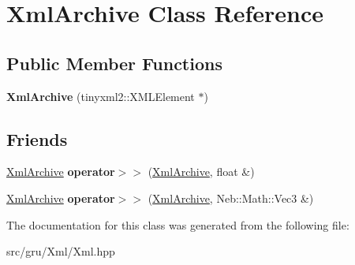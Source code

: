 \hypertarget{classXmlArchive}{\section{\-Xml\-Archive \-Class \-Reference}
\label{classXmlArchive}
}
\subsection*{\-Public \-Member \-Functions}
\begin{DoxyCompactItemize}
\item 
\hypertarget{classXmlArchive_af60507762c0e126c686ba370b502c519}{{\bfseries \-Xml\-Archive} (tinyxml2\-::\-X\-M\-L\-Element $\ast$)}\label{classXmlArchive_af60507762c0e126c686ba370b502c519}

\end{DoxyCompactItemize}
\subsection*{\-Friends}
\begin{DoxyCompactItemize}
\item 
\hypertarget{classXmlArchive_ac00483f1bd65b3d880d13399bdf383a1}{\hyperlink{classXmlArchive}{\-Xml\-Archive} {\bfseries operator$>$$>$} (\hyperlink{classXmlArchive}{\-Xml\-Archive}, float \&)}\label{classXmlArchive_ac00483f1bd65b3d880d13399bdf383a1}

\item 
\hypertarget{classXmlArchive_ada2eb5f73207ee6133a5f6876c0bbe79}{\hyperlink{classXmlArchive}{\-Xml\-Archive} {\bfseries operator$>$$>$} (\hyperlink{classXmlArchive}{\-Xml\-Archive}, \-Neb\-::\-Math\-::\-Vec3 \&)}\label{classXmlArchive_ada2eb5f73207ee6133a5f6876c0bbe79}

\end{DoxyCompactItemize}


\-The documentation for this class was generated from the following file\-:\begin{DoxyCompactItemize}
\item 
src/gru/\-Xml/\-Xml.\-hpp\end{DoxyCompactItemize}
